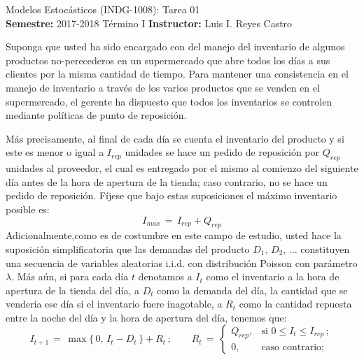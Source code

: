 \documentclass[ a4paper, twoside, 11pt]{article}
\newcommand{\numero}{01}
\begin{document}
\allowdisplaybreaks



\begin{center}
\Large Modelos Estoc\'asticos (INDG-1008): Tarea \numero \\[1ex]
\small \textbf{Semestre:} 2017-2018 T\'ermino I \qquad
\textbf{Instructor:} Luis I. Reyes Castro
\end{center}
\fullskip

%

\begin{problem}
Suponga que usted ha sido encargado con del manejo del inventario de algunos productos no-perecederos en un supermercado que abre todos los d\'ias a sus clientes por la misma cantidad de tiempo. Para mantener una consistencia en el manejo de inventario a trav\'es de los varios productos que se venden en el supermercado, el gerente ha dispuesto que todos los inventarios se controlen mediante pol\'iticas de punto de reposici\'on. 

M\'as precisamente, al final de cada d\'ia se cuenta el inventario del producto y si este es menor o igual a $I_{rep}$ unidades se hace un pedido de reposici\'on por $Q_{rep}$ unidades al proveedor, el cual es entregado por el mismo al comienzo del siguiente d\'ia antes de la hora de apertura de la tienda; caso contrario, no se hace un pedido de reposici\'on. F\'ijese que bajo estas suposiciones el m\'aximo inventario posible es:
\[
I_{max} \, = \, I_{rep} + Q_{rep}
\]
Adicionalmente,como es de costumbre en este campo de estudio, usted hace la suposici\'on simplificatoria que las demandas del producto $D_1, \, D_2, \, \dots$ constituyen una secuencia de variables aleatorias i.i.d. con distribuci\'on Poisson con par\'ametro $\lambda$. M\'as a\'un, si para cada d\'ia $t$ denotamos a $I_t$ como el inventario a la hora de apertura de la tienda del \tavo d\'ia, a $D_t$ como la demanda del d\'ia, \ie la cantidad que se vender\'ia ese d\'ia si el inventario fuere inagotable, a $R_t$ como la cantidad repuesta entre la noche del \tavo d\'ia y la hora de apertura del \tMavo d\'ia, tenemos que:
\[
I_{t+1} \, = \, \max \{ \, 0, \, I_t - D_t \, \} + R_t \, ; \qquad
R_t \, = \, 
\begin{cases}
Q_{rep}, & \text{si } 0 \leq I_t \leq I_{rep} \, ; \\
0, & \text{caso contrario;}
\end{cases}
\]


\end{problem}
\end{document}
